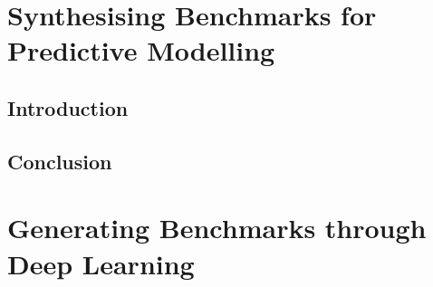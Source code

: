 \ifstapled
\chapter{Synthesising Benchmarks for Predictive Modelling}
\section{Introduction}
\lipsum[1-2]

\section{Conclusion}
\lipsum[1-2]
\else
\chapter{Generating Benchmarks through Deep Learning}
\label{chap:clgen}









\fi

